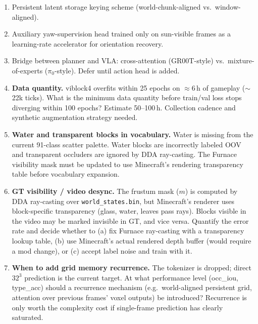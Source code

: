 \documentclass[11pt,a4paper]{article}
\begin{document}
\begin{enumerate}
  \item Persistent latent storage keying scheme (world-chunk-aligned vs.\ window-aligned).
  \item Auxiliary yaw-supervision head trained only on sun-visible frames as a learning-rate accelerator for orientation recovery.
  \item Bridge between planner and VLA: cross-attention (GR00T-style) vs.\ mixture-of-experts ($\pi_0$-style). Defer until action head is added.
  \item \textbf{Data quantity.} viblock4 overfits within 25 epochs on $\approx$6\,h of gameplay ($\sim$22k ticks). What is the minimum data quantity before train/val loss stops diverging within 100 epochs? Estimate 50--100\,h. Collection cadence and synthetic augmentation strategy needed.
  \item \textbf{Water and transparent blocks in vocabulary.} Water is missing from the current 91-class scatter palette. Water blocks are incorrectly labeled OOV and transparent occluders are ignored by DDA ray-casting. The Furnace visibility mask must be updated to use Minecraft's rendering transparency table before vocabulary expansion.
  \item \textbf{GT visibility / video desync.} The frustum mask ($m$) is computed by DDA ray-casting over \texttt{world\_states.bin}, but Minecraft's renderer uses block-specific transparency (glass, water, leaves pass rays). Blocks visible in the video may be marked invisible in GT, and vice versa. Quantify the error rate and decide whether to (a) fix Furnace ray-casting with a transparency lookup table, (b) use Minecraft's actual rendered depth buffer (would require a mod change), or (c) accept label noise and train with it.
  \item \textbf{When to add grid memory recurrence.} The tokenizer is dropped; direct $32^3$ prediction is the current target. At what performance level (occ\_iou, type\_acc) should a recurrence mechanism (e.g.\ world-aligned persistent grid, attention over previous frames' voxel outputs) be introduced? Recurrence is only worth the complexity cost if single-frame prediction has clearly saturated.
\end{enumerate}
\end{document}
